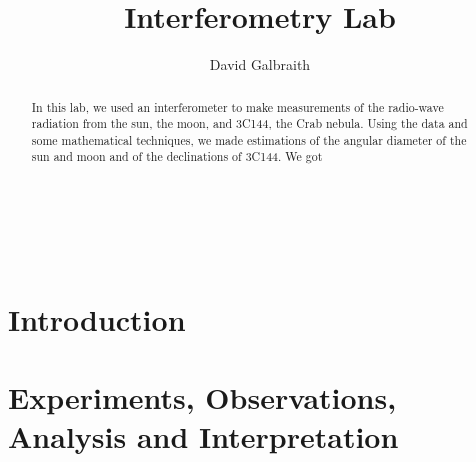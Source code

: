 \documentclass[11pt]{article}
\begin{document}
\title{Interferometry Lab}
\author{David Galbraith}
\maketitle

\normalsize
\begin{abstract} 
In this lab, we used an interferometer to make measurements of the radio-wave radiation from the sun, the moon, and 3C144, the Crab nebula. Using the data and some mathematical techniques, we made estimations of the angular diameter of the sun and moon and of the declinations of 3C144. We got  %
\end{abstract}


\medskip                        %

\thispagestyle{plain}

\section{Introduction}


\section{Experiments, Observations, Analysis and Interpretation} 
\end{document}
